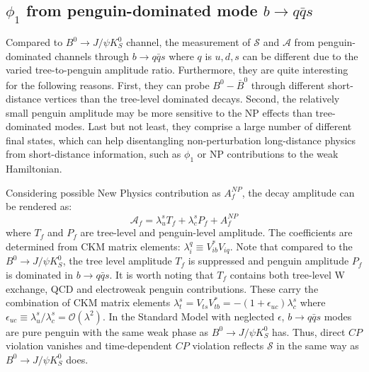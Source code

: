\subsection{$\phi_1$ from penguin-dominated mode $b\to q\bar{q}s$}
Compared to $B^0 \to J/\psi K^0_S$ channel, the measurement of $\mathcal{S}$ and $\mathcal{A}$ from penguin-dominated channels through $b \to q\bar{q}s$ where $q$ is $u,d,s$ can be different due to the varied tree-to-penguin amplitude ratio. Furthermore, they are quite interesting for the following reasons\cite{b2book}. First, they can probe $B^0-\bar{B}^0$ through different short-distance vertices than the tree-level dominated decays. Second, the relatively small penguin amplitude may be more sensitive to the NP effects than tree-dominated modes. Last but not least, they comprise a large number of different final states, which can help disentangling non-perturbation long-distance physics from short-distance information, such as $\phi_1$ or NP contributions to the weak Hamiltonian. 

\begin{comment}
First,  the $b\to q\bar{q}s$  gives a different vertex in gluonic decay than tree diagram. 
Second, such process is tree level suppressed but penguin-dominated, so the New Physics effects can be easier to be spotted. The SM agrees with tree level process in percent accuracy so the sub-percent BSM effects may be hard to see. Similar to Fig(1-7), due to FCNC tree level forbidden, 
\begin{figure}[H]
\centering
\texttt{[image: Bto3Ks]}
\caption{penguin mode $b\to q\bar{q}s$ where $\phi$ is formed by two strange quark as the intermediate state.}
\end{figure}

\end{comment}
Considering possible New Physics contribution as $A_f^{NP}$, the decay amplitude can be rendered as: 
\begin{equation}
\mathcal{A}_f= 
\lambda^s_u T_f + 
\lambda^s_c P_f +
{A}_f^{NP} 
\end{equation}
where $T_f$ and $P_f$ are tree-level and penguin-level amplitude. The coefficients  are determined from CKM matrix elements: $\lambda^q_i \equiv V^*_{ib}V_{iq}$. Note that compared to the $B^0 \to J/\psi K^0_S$,
the tree level amplitude $T_f$ is suppressed and penguin amplitude $P_f$ is dominated in $b\to q\bar{q}s$. It is worth noting that $T_f$ contains both tree-level W exchange, QCD and electroweak penguin contributions. These carry the combination of CKM matrix elements $\lambda_t^s = V_{ts}V^*_{tb}=-(1+\epsilon_{uc})\lambda^s_c$ where $\epsilon_{uc} \equiv \lambda^s_u / \lambda^s_c = \mathcal{O}(\lambda^2)$. In the Standard Model with neglected $\epsilon$,  $b\to q\bar{q}s$ modes are pure penguin with the same weak phase as $B^0 \to J/\psi K^0_S$ has. Thus, direct $CP$ violation vanishes and time-dependent $CP$ violation reflects $\mathcal{S}$ in the same way as $B^0 \to J/\psi K^0_S$ does. 


